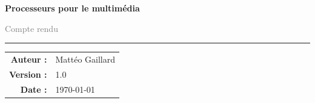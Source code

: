 \documentclass[11pt,a4paper]{article}
\newcommand{\documenttitle}{Processeurs pour le multimédia}
\newcommand{\documentauthor}{Mattéo Gaillard}
\newcommand{\documentdate}{\today}
\newcommand{\documentversion}{1.0}
\begin{document}
\hypersetup{pageanchor=false}
\begin{titlepage}
    \centering

    \vspace{2cm}

    {\Huge\bfseries\color{dark}\documenttitle}

    \vspace{0.5cm}

    {\Large\textcolor{gray}{Compte rendu}}

    \vspace{2cm}

    \rule{0.7\textwidth}{0.5pt}

    \vspace{1cm}

    \begin{tabular}{rl}
        \textbf{Auteur :} & \documentauthor \\
        \textbf{Version :} & \documentversion \\
        \textbf{Date :} & \documentdate \\
    \end{tabular}

\end{titlepage}
\hypersetup{pageanchor=true}

\tableofcontents
\newpage



\newpage

\newpage

\newpage



\end{document}
